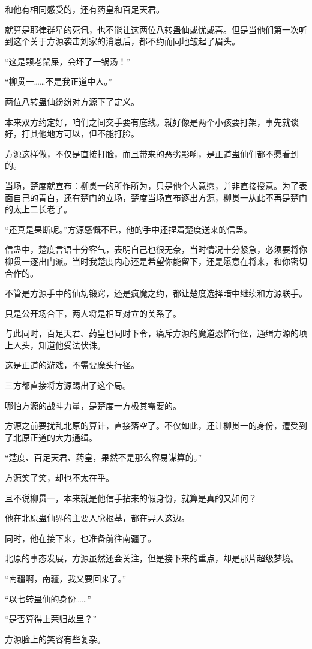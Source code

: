 \begin{this_body}
和他有相同感受的，还有药皇和百足天君。

就算是耶律群星的死讯，也不能让这两位八转蛊仙或忧或喜。但是当他们第一次听到这个关于方源袭击刘家的消息后，都不约而同地皱起了眉头。

“这是颗老鼠屎，会坏了一锅汤！”

“柳贯一……不是我正道中人。”

两位八转蛊仙纷纷对方源下了定义。

本来双方约定好，咱们之间交手要有底线。就好像是两个小孩要打架，事先就谈好，打其他地方可以，但不能打脸。

方源这样做，不仅是直接打脸，而且带来的恶劣影响，是正道蛊仙们都不愿看到的。

当场，楚度就宣布：柳贯一的所作所为，只是他个人意愿，并非直接授意。为了表面自己的青白，还有楚门的立场，楚度当场宣布逐出方源，柳贯一从此不再是楚门的太上二长老了。

“还真是果断呢。”方源感慨不已，他的手中还捏着楚度送来的信蛊。

信蛊中，楚度言语十分客气，表明自己也很无奈，当时情况十分紧急，必须要将你柳贯一逐出门派。当时我楚度内心还是希望你能留下，还是愿意在将来，和你密切合作的。

不管是方源手中的仙劫锻窍，还是疯魔之约，都让楚度选择暗中继续和方源联手。

只是公开场合下，两人将是相互对立的关系了。

与此同时，百足天君、药皇也同时下令，痛斥方源的魔道恐怖行径，通缉方源的项上人头，知道他受法伏诛。

这是正道的游戏，不需要魔头行径。

三方都直接将方源踢出了这个局。

哪怕方源的战斗力量，是楚度一方极其需要的。

方源之前要扰乱北原的算计，直接落空了。不仅如此，还让柳贯一的身份，遭受到了北原正道的大力通缉。

“楚度、百足天君、药皇，果然不是那么容易谋算的。”

方源笑了笑，却也不太在乎。

且不说柳贯一，本来就是他信手拈来的假身份，就算是真的又如何？

他在北原蛊仙界的主要人脉根基，都在异人这边。

同时，他在接下来，也准备前往南疆了。

北原的事态发展，方源虽然还会关注，但是接下来的重点，却是那片超级梦境。

“南疆啊，南疆，我又要回来了。”

“以七转蛊仙的身份……”

“是否算得上荣归故里？”

方源脸上的笑容有些复杂。

\end{this_body}


